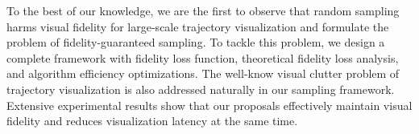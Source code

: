  To the best of our knowledge, we are the first to observe that random sampling harms visual fidelity for large-scale trajectory visualization and formulate the problem of fidelity-guaranteed sampling. To tackle this problem, we design a complete framework with fidelity loss function, theoretical fidelity loss analysis, and algorithm efficiency optimizations. The well-know visual clutter problem of trajectory visualization is also addressed naturally in our sampling framework. Extensive experimental results show that our proposals effectively maintain visual fidelity and reduces visualization latency at the same time.


%
